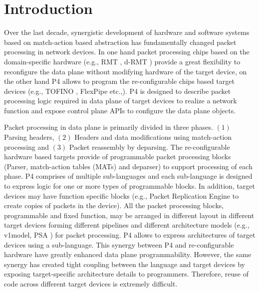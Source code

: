 \section{Introduction}
Over the last decade, synergistic development of hardware and software systems based on match-action based abstraction has fundamentally changed packet processing in network devices.
In one hand packet processing chips based on the domain-specific hardware (e.g., RMT \cite{Bosshart:2013:FMF:2486001.2486011}, d-RMT \cite{Chole:2017:DDP:3098822.3098823}) provide a  great flexibility to reconfigure the data plane without modifying hardware of the target device, on the other hand P4 \cite{Bosshart:2014:PPP:2656877.2656890, p4lang} allows to program the re-configurable chips based target devices (e.g., TOFINO \cite{tofino}, FlexPipe etc.,).
P4 is designed to describe packet processing logic required in data plane of target devices to realize a network function and expose control plane APIs to configure the data plane objects.

Packet processing in data plane is primarily divided in three phases. $(1)$ Parsing headers, $(2)$ Headers and data modifications using match-action processing and $(3)$ Packet reassembly by deparsing.
The re-configurable hardware based targets provide of programmable packet processing blocks (Parser, match-action tables (MATs) and deparser) to support processing of each phase. 
P4 comprises of multiple sub-languages and each sub-language is designed to express logic for one or more types of programmable blocks. 
In addition, target devices may have function specific blocks (e.g., Packet Replication Engine to create copies of packets in the device).
All the packet processing blocks, programmable and fixed function, may be arranged in different layout in different target devices forming different pipelines and different architecture models (e.g., v1model\cite{v1model.p4}, PSA \cite{psa}) for packet processing.
P4 allows to express architectures of target devices using a sub-language.
This synergy between P4 and re-configurable hardware have greatly enhanced data plane programmability. 
However, the same synergy has created tight coupling between the language and target devices by exposing target-specific architecture details to programmers.
Therefore, reuse of code across different target devices is extremely difficult.


